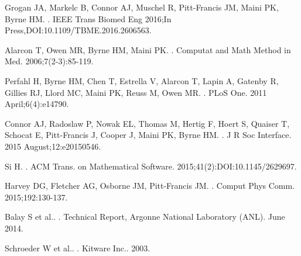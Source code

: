 \documentclass[10pt,letterpaper]{article}
\begin{document}
\begin{thebibliography}{10}
Grogan JA, Markelc B, Connor AJ, Muschel R, Pitt-Francis JM, Maini PK, Byrne HM.
.
\newblock IEEE Trans Biomed Eng 2016;In Press,DOI:10.1109/TBME.2016.2606563.

Alarcon T, Owen MR, Byrne HM, Maini PK.
.
\newblock Computat and Math Method in Med. 2006;7(2-3):85-119.

Perfahl H, Byrne HM, Chen T, Estrella V, Alarcon T, Lapin A, Gatenby R, Gillies RJ, Llord MC, Maini PK, Reuss M, Owen MR.
.
\newblock PLoS One. 2011 April;6(4):e14790.

Connor AJ, Radoslaw P, Nowak EL, Thomas M, Hertig F, Hoert S, Quaiser T, Schocat E, Pitt-Francis J, Cooper J, Maini PK, Byrne HM.
.
\newblock J R Soc Interface. 2015 August;12:e20150546.

Si H.
.
\newblock ACM Trans. on Mathematical Software. 2015;41(2):DOI:10.1145/2629697.

Harvey DG, Fletcher AG, Osborne JM, Pitt-Francis JM.
.
\newblock Comput Phys Comm. 2015;192:130-137.

Balay S et al..
.
\newblock Technical Report, Argonne National Laboratory (ANL). June 2014.

Schroeder W et al..
.
\newblock  Kitware Inc.. 2003.

\end{thebibliography}
\end{document}
